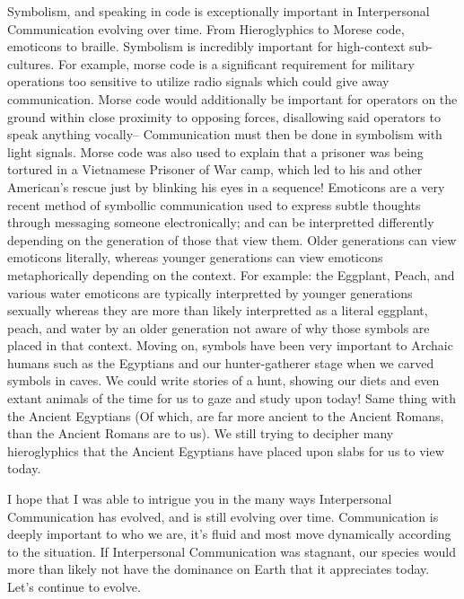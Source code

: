 \documentclass[12pt]{article}
\begin{document}
\par
Symbolism, and speaking in code is exceptionally important in Interpersonal Communication evolving over time. From Hieroglyphics to Morese code, emoticons to braille. Symbolism is incredibly important for high-context sub-cultures. For example, morse code is a significant requirement for military operations too sensitive to utilize radio signals which could give away communication. Morse code would additionally be important for operators on the ground within close proximity to opposing forces, disallowing said operators to speak anything vocally-- Communication must then be done in symbolism with light signals. Morse code was also used to explain that a prisoner was being tortured in a Vietnamese Prisoner of War camp, which led to his and other American's rescue just by blinking his eyes in a sequence! Emoticons are a very recent method of symbollic communication used to express subtle thoughts through messaging someone electronically; and can be interpretted differently depending on the generation of those that view them. Older generations can view emoticons literally, whereas younger generations can view emoticons metaphorically depending on the context. For example: the Eggplant, Peach, and various water emoticons are typically interpretted by younger generations sexually whereas they are more than likely interpretted as a literal eggplant, peach, and water by an older generation not aware of why those symbols are placed in that context. Moving on, symbols have been very important to Archaic humans such as the Egyptians and our hunter-gatherer stage when we carved symbols in caves. We could write stories of a hunt, showing our diets and even extant animals of the time for us to gaze and study upon today! Same thing with the Ancient Egyptians (Of which, are far more ancient to the Ancient Romans, than the Ancient Romans are to us). We still trying to decipher many hieroglyphics that the Ancient Egyptians have placed upon slabs for us to view today.
\par
I hope that I was able to intrigue you in the many ways Interpersonal Communication has evolved, and is still evolving over time. Communication is deeply important to who we are, it's fluid and most move dynamically according to the situation. If Interpersonal Communication was stagnant, our species would more than likely not have the dominance on Earth that it appreciates today. Let's continue to evolve.
\end{document}
